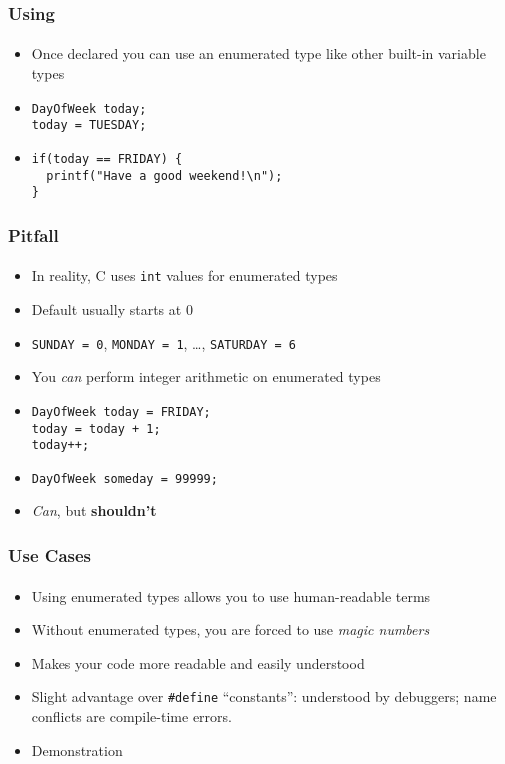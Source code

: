 \documentclass[]{beamer}
\begin{document}
\begin{frame}[fragile]
    \frametitle{Using}
    \framesubtitle{}

\begin{itemize}[<+->]
  \item Once declared you can use an enumerated type like other built-in variable types
  \item[~]
\begin{verbatim}
DayOfWeek today;
today = TUESDAY;
\end{verbatim}
  \item[~]
\begin{verbatim}
if(today == FRIDAY) {
  printf("Have a good weekend!\n");
}
\end{verbatim}

\end{itemize} 

\end{frame}

\begin{frame}[fragile]
    \frametitle{Pitfall}
    \framesubtitle{}
    
\begin{itemize}[<+->]
  \item In reality, C uses \texttt{int} values for enumerated types
  \item Default usually starts at 0
  \item \texttt{SUNDAY = 0}, \texttt{MONDAY = 1}, \ldots, \texttt{SATURDAY = 6}
  \item You \emph{can} perform integer arithmetic on enumerated types
  \item[~]
\begin{verbatim}
DayOfWeek today = FRIDAY;
today = today + 1;
today++;
\end{verbatim}
  \item[~]
\begin{verbatim}
DayOfWeek someday = 99999;
\end{verbatim}
  \item \emph{Can}, but \textbf{shouldn't}
\end{itemize} 

\end{frame}

\begin{frame}[fragile]
    \frametitle{Use Cases}
    \framesubtitle{}

\begin{itemize}[<+->]
  \item Using enumerated types allows you to use human-readable terms
  \item Without enumerated types, you are forced to use \emph{magic numbers}
  \item Makes your code more readable and easily understood
  \item Slight advantage over \texttt{#define} ``constants'': understood by debuggers; name conflicts are compile-time errors.
  \item Demonstration %
\end{itemize}
    
\end{frame}
\end{document}
